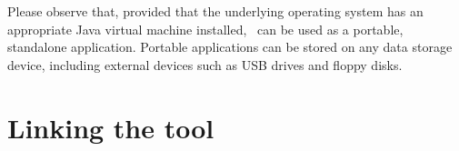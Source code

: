 Please observe that, provided that the underlying operating system has an appropriate Java virtual machine installed, \arara\ can be used as a portable, standalone application. Portable applications can be stored on any data storage device, including external devices such as USB drives and floppy disks.

\section{Linking the tool}
\label{sec:linkingthetool}





